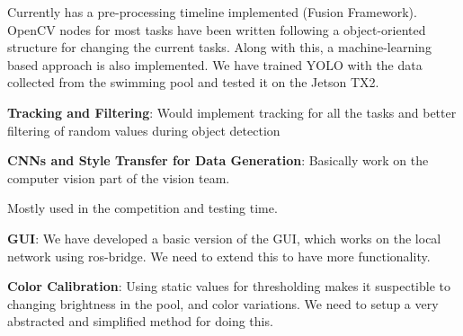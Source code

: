 Currently has a pre-\/processing timeline implemented (Fusion Framework). Open\+CV nodes for most tasks have been written following a object-\/oriented structure for changing the current tasks. Along with this, a machine-\/learning based approach is also implemented. We have trained Y\+O\+LO with the data collected from the swimming pool and tested it on the Jetson T\+X2.


\begin{DoxyItemize}
\item {\bfseries Tracking and Filtering}\+: Would implement tracking for all the tasks and better filtering of random values during object detection
\item {\bfseries C\+N\+Ns and Style Transfer for Data Generation}\+: Basically work on the computer vision part of the vision team.
\end{DoxyItemize}

Mostly used in the competition and testing time.


\begin{DoxyItemize}
\item {\bfseries G\+UI}\+: We have developed a basic version of the G\+UI, which works on the local network using {\ttfamily ros-\/bridge}. We need to extend this to have more functionality.
\item {\bfseries Color Calibration}\+: Using static values for thresholding makes it suspectible to changing brightness in the pool, and color variations. We need to setup a very abstracted and simplified method for doing this. 
\end{DoxyItemize}